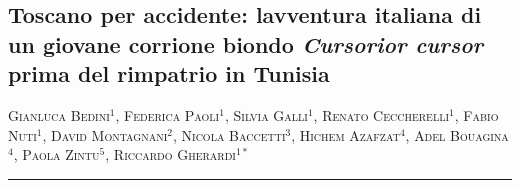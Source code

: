\setcounter{figure}{0}
\setcounter{table}{0}

\begin{adjustwidth}{-3.5cm}{0cm}
\pagestyle{CIOpage}
\chapter*[Il recupero di un corrione biondo in Toscana]{Toscano per accidente: l{\textquotesingle}avventura italiana di
un giovane corrione biondo \textbf{\textit{Cursorior cursor}}\textbf{
prima del rimpatrio in Tunisia}}

{\raggedleft
\textsc{Gianluca Bedini}$^{1}$, \textsc{Federica Paoli}$^{1}$,
\textsc{Silvia Galli}$^{1}$, \textsc{Renato Ceccherelli}$^{1}$,
\textsc{Fabio Nuti}$^{1}$, \textsc{David Montagnani}$^{2}$,
\textsc{Nicola Baccetti}$^{3}$, \textsc{Hichem Azafzat}$^{4}$,
\textsc{Adel Bouagina}$^{4}$, \textsc{Paola Zintu}$^{5}$, 
\textsc{Riccardo Gherardi}$^{1*}$ } \\

          
\noindent\color{MUSEBLUE}\rule{27cm}{2pt}
\vspace{1cm}
\end{adjustwidth}



